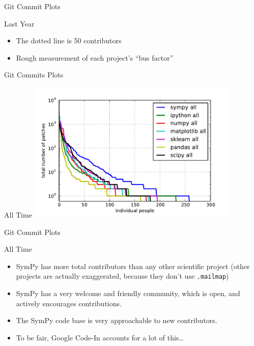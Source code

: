 \documentclass[xcolor=svgnames]{beamer}
\begin{document}
\begin{frame}{Git Commit Plots}
  \begin{block}{Last Year}
    \begin{itemize}
    \item The dotted line is 50 contributors
    \item Rough measurement of each project's ``bus factor''
    \end{itemize}
  \end{block}
\end{frame}

\begin{frame}{Git Commits Plots}
  \begin{block}{All Time}
    \includegraphics[width=4in]{commits-all.pdf}
  \end{block}
\end{frame}

\begin{frame}{Git Commit Plots}
  \begin{block}{All Time}
    \begin{itemize}
    \item SymPy has more total contributors than any other scientific project
      (other projects are actually exaggerated, because they don't use
      \texttt{.mailmap})
    \item SymPy has a very welcome and friendly community, which is open, and
      actively encourages contributions.
    \item The SymPy code base is very approachable to new contributors.
    \item To be fair, Google Code-In accounts for a lot of this\ldots
    \end{itemize}
  \end{block}
\end{frame}
\end{document}
